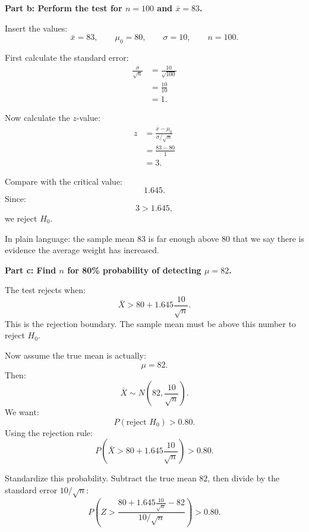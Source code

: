 \documentclass[11pt,a4paper]{article}
\begin{document}
\textbf{Part b: Perform the test for \(n=100\) and \(\bar{x}=83\).}

Insert the values:
\[
\bar{x}=83,\qquad \mu_0=80,\qquad \sigma=10,\qquad n=100.
\]

First calculate the standard error:
\begin{align*}
\frac{\sigma}{\sqrt{n}}
&=\frac{10}{\sqrt{100}}\\
&=\frac{10}{10}\\
&=1.
\end{align*}

Now calculate the \(z\)-value:
\begin{align*}
z
&=\frac{\bar{x}-\mu_0}{\sigma/\sqrt{n}}\\
&=\frac{83-80}{1}\\
&=3.
\end{align*}

Compare with the critical value:
\[
1.645.
\]
Since:
\[
3>1.645,
\]
we reject \(H_0\).

In plain language: the sample mean \(83\) is far enough above \(80\) that we say there is evidence the average weight has increased.

\textbf{Part c: Find \(n\) for 80\% probability of detecting \(\mu=82\).}

The test rejects when:
\[
\bar{X}>80+1.645\frac{10}{\sqrt{n}}.
\]
This is the rejection boundary. The sample mean must be above this number to reject \(H_0\).

Now assume the true mean is actually:
\[
\mu=82.
\]
Then:
\[
\bar{X}\sim N\left(82,\frac{10}{\sqrt{n}}\right).
\]
We want:
\[
P(\text{reject }H_0)>0.80.
\]
Using the rejection rule:
\[
P\left(\bar{X}>80+1.645\frac{10}{\sqrt{n}}\right)>0.80.
\]

Standardize this probability. Subtract the true mean \(82\), then divide by the standard error \(10/\sqrt{n}\):
\[
P\left(
Z>
\frac{80+1.645\frac{10}{\sqrt{n}}-82}{10/\sqrt{n}}
\right)>0.80.
\]
\end{document}
